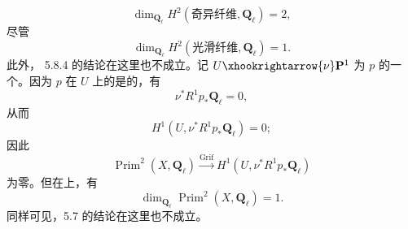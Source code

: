\[\dim_{\mathbf Q_\ell}H^2(\text{奇异纤维},\mathbf Q_\ell)=2,\]
尽管
\[\dim_{\mathbf Q_\ell}H^2(\text{光滑纤维},\mathbf Q_\ell)=1.\]
此外， 5.8.4 的结论在这里也不成立。记 $U\xhookrightarrow{\nu}\mathbf P^1$ 为 $p$ 的一个。因为 $p$ 在 $U$ 上的是的，有
\[\nu^*R^1p_*\mathbf Q_\ell=0,\]
从而
\[H^1(U,\nu^*R^1p_*\mathbf Q_\ell)=0;\]
因此
\[\operatorname{Prim}^2(X,\mathbf Q_\ell)\xrightarrow{\operatorname{Grif}}H^1(U,\nu^*R^1p_*\mathbf Q_\ell)\]
为零。但在上，有
\[\dim_{\mathbf Q_\ell}\operatorname{Prim}^2(X,\mathbf Q_\ell)=1.\]
同样可见，5.7 的结论在这里也不成立。
